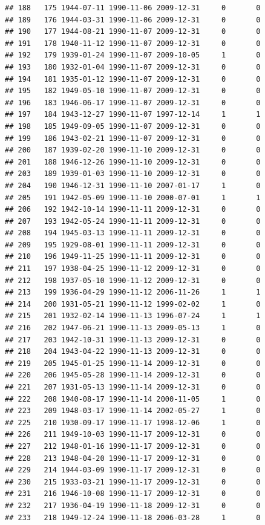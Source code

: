 \documentclass[
]{book}
\begin{document}
\begin{verbatim}
## 188   175 1944-07-11 1990-11-06 2009-12-31     0       0
## 189   176 1944-03-31 1990-11-06 2009-12-31     0       0
## 190   177 1944-08-21 1990-11-07 2009-12-31     0       0
## 191   178 1940-11-12 1990-11-07 2009-12-31     0       0
## 192   179 1939-01-24 1990-11-07 2009-10-05     1       0
## 193   180 1932-01-04 1990-11-07 2009-12-31     0       0
## 194   181 1935-01-12 1990-11-07 2009-12-31     0       0
## 195   182 1949-05-10 1990-11-07 2009-12-31     0       0
## 196   183 1946-06-17 1990-11-07 2009-12-31     0       0
## 197   184 1943-12-27 1990-11-07 1997-12-14     1       1
## 198   185 1949-09-05 1990-11-07 2009-12-31     0       0
## 199   186 1943-02-21 1990-11-07 2009-12-31     0       0
## 200   187 1939-02-20 1990-11-10 2009-12-31     0       0
## 201   188 1946-12-26 1990-11-10 2009-12-31     0       0
## 203   189 1939-01-03 1990-11-10 2009-12-31     0       0
## 204   190 1946-12-31 1990-11-10 2007-01-17     1       0
## 205   191 1942-05-09 1990-11-10 2000-07-01     1       1
## 206   192 1942-10-14 1990-11-11 2009-12-31     0       0
## 207   193 1942-05-24 1990-11-11 2009-12-31     0       0
## 208   194 1945-03-13 1990-11-11 2009-12-31     0       0
## 209   195 1929-08-01 1990-11-11 2009-12-31     0       0
## 210   196 1949-11-25 1990-11-11 2009-12-31     0       0
## 211   197 1938-04-25 1990-11-12 2009-12-31     0       0
## 212   198 1937-05-10 1990-11-12 2009-12-31     0       0
## 213   199 1936-04-29 1990-11-12 2006-11-26     1       1
## 214   200 1931-05-21 1990-11-12 1999-02-02     1       0
## 215   201 1932-02-14 1990-11-13 1996-07-24     1       1
## 216   202 1947-06-21 1990-11-13 2009-05-13     1       0
## 217   203 1942-10-31 1990-11-13 2009-12-31     0       0
## 218   204 1943-04-22 1990-11-13 2009-12-31     0       0
## 219   205 1945-01-25 1990-11-14 2009-12-31     0       0
## 220   206 1945-05-28 1990-11-14 2009-12-31     0       0
## 221   207 1931-05-13 1990-11-14 2009-12-31     0       0
## 222   208 1940-08-17 1990-11-14 2000-11-05     1       0
## 223   209 1948-03-17 1990-11-14 2002-05-27     1       0
## 225   210 1930-09-17 1990-11-17 1998-12-06     1       0
## 226   211 1949-10-03 1990-11-17 2009-12-31     0       0
## 227   212 1948-01-16 1990-11-17 2009-12-31     0       0
## 228   213 1948-04-20 1990-11-17 2009-12-31     0       0
## 229   214 1944-03-09 1990-11-17 2009-12-31     0       0
## 230   215 1933-03-21 1990-11-17 2009-12-31     0       0
## 231   216 1946-10-08 1990-11-17 2009-12-31     0       0
## 232   217 1936-04-19 1990-11-18 2009-12-31     0       0
## 233   218 1949-12-24 1990-11-18 2006-03-28     1       0

\end{verbatim}
\end{document}
